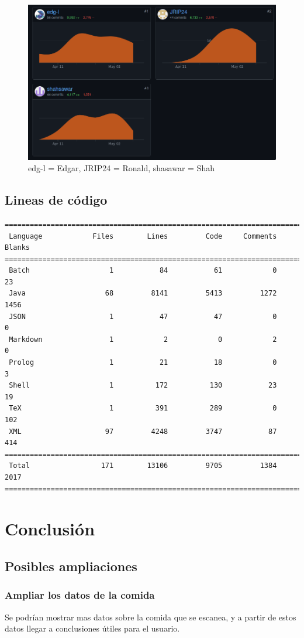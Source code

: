 \documentclass[12pt,a4paper]{article}
\begin{document}
\begin{figure}[h]
 	\centering
	\includegraphics[width=\textwidth]{git-contributors}
	\caption{edg-l = Edgar, JRIP24 = Ronald, shasawar = Shah}
\end{figure}

\subsection{Lineas de código}

\begin{verbatim}
===============================================================================
 Language            Files        Lines         Code     Comments       Blanks
===============================================================================
 Batch                   1           84           61            0           23
 Java                   68         8141         5413         1272         1456
 JSON                    1           47           47            0            0
 Markdown                1            2            0            2            0
 Prolog                  1           21           18            0            3
 Shell                   1          172          130           23           19
 TeX                     1          391          289            0          102
 XML                    97         4248         3747           87          414
===============================================================================
 Total                 171        13106         9705         1384         2017
===============================================================================
\end{verbatim}

\newpage

\section{Conclusión}

\subsection{Posibles ampliaciones}

\subsubsection{Ampliar los datos de la comida}
Se podrían mostrar mas datos sobre la comida que se escanea, y a partir de estos datos llegar a conclusiones útiles para el usuario.
\end{document}
